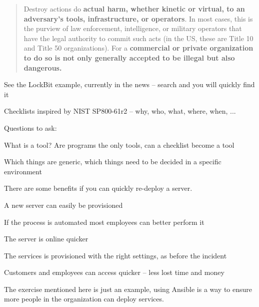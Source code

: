 \documentclass[Screen16to9,17pt]{foils}
\begin{document}


\begin{quote}
Destroy actions do {\bf actual harm, whether kinetic or virtual, to an adversary’s tools,
infrastructure, or operators}. In most cases, this is the purview of law enforcement,
intelligence, or military operators that have the legal authority to commit such acts
(in the US, these are Title 10 and Title 50 organizations). For a {\bf commercial or private
organization to do so is not only generally accepted to be illegal but also dangerous.}
\end{quote}

\begin{list2}
    \item See the LockBit example, currently in the news -- search and you will quickly find it
\end{list2}




\begin{list2}
\item Checklists inspired by NIST SP800-61r2 -- why, who, what, where, when, ...
\end{list2}



Questions to ask:
\begin{list2}
\item What is a tool? Are programs the only tools, can a checklist become a tool
\item Which things are generic, which things need to be decided in a specific environment
\end{list2}




There are some benefits if you can quickly re-deploy a server.

\begin{list2}
\item A new server can easily be provisioned
\item If the process is automated most employees can better perform it
\item The server is online quicker
\item The services is provisioned with the right settings, as before the incident
\item Customers and employees can access quicker -- less lost time and money
\end{list2}

The exercise mentioned here is just an example, using Ansible is a way to ensure more people in the organization can deploy services.

\end{document}
